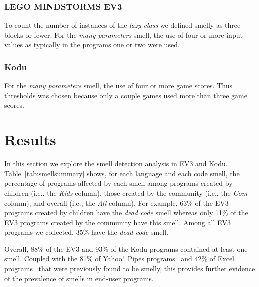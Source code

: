 \documentclass[conference]{IEEEtran}
\newcommand{\ms}{LEGO MINDSTORMS EV3}
\begin{document}
\subsubsection{\ms}
To count the number of instances of the \emph{lazy class} we defined smelly as three blocks or fewer. For the \emph{many parameters} smell, the use of four or more input values as typically in the programs one or two were used.

\subsubsection{Kodu}
For the  \emph{many parameters} smell, the use of four or more game scores. Thus thresholds was chosen because only a couple games used more than three game scores. 


\section{Results}
\label{sec:results}
In this section we explore the smell detection analysis in EV3 and Kodu. 
Table~\ref{tab:smellsummary} shows, for each language and each code smell, the percentage of programs affected by each smell among programs created by children (i.e., the \emph{Kids} column), those created by the community (i.e., the \emph{Com} column), and overall (i.e., the \emph{All} column). For example, 63\% of the EV3 programs created by children have the \emph{dead code} smell whereas only 11\% of the EV3 programs created by the community have this smell. Among all EV3 programs we collected, 35\% have the \emph{dead code} smell. 
 
Overall, 88\% of the EV3 and 93\% of the Kodu programs contained at least one smell. Coupled with the 81\% of Yahoo!\ Pipes programs~\cite{StoleeTSE2013} and 42\% of Excel programs~\cite{Hermans2012intra} that were previously found to be smelly, this provides further evidence of the prevalence of smells in end-user programs. 
\end{document}
